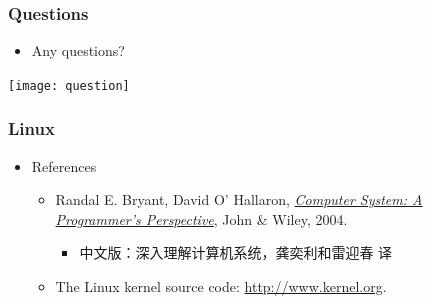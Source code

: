 \documentclass[CJKutf8,dvipsnames,table]{beamer}
\begin{document}
\begin{CJK*}{UTF8}{song}
\begin{frame}[fragile]
\fi

\end{frame}
  

  
  \begin{frame}
    \frametitle{Questions}
    \begin{itemize}
    \item Any questions? 
    \end{itemize}
    \begin{center}
      \texttt{[image: question]}
    \end{center}
  \end{frame}
  
  \begin{frame}
    \frametitle{Linux} \pause
    \begin{itemize}
    \item References  \pause
      \begin{itemize}
      \item Randal E. Bryant, David O' Hallaron, \href{http://csapp.cs.cmu.edu/}{\emph{Computer System: A Programmer's Perspective}}, John \& Wiley, 2004.  \pause
        \begin{itemize}
        \item 中文版：深入理解计算机系统，龚奕利和雷迎春 译  \pause
        \end{itemize}
      \item The Linux kernel source code: \url{http://www.kernel.org}. 
      \end{itemize}
    \end{itemize}
  \end{frame}


\end{CJK*}
\end{document}

